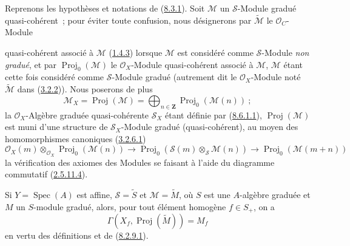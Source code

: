 \begin{env}[8.12.1]
\label{II.8.12.1-fr}
Reprenons les hypothèses et notations de
(\hyperref[II.8.3.1-fr]{8.3.1}). Soit $\mathcal{M}$ un
$\mathcal{S}$-Module gradué quasi-cohérent~; pour éviter toute confusion,
nous désignerons par $\widetilde{\mathcal{M}}$ le $\mathcal{O}_C$-Module

quasi-cohérent associé à $\mathcal{M}$
(\hyperref[II.1.4.3-fr]{1.4.3}) lorsque $\mathcal{M}$ est considéré comme
$\mathcal{S}$-Module \emph{non gradué}, et par
$\operatorname{Proj}_0(\mathcal{M})$ le $\mathcal{O}_X$-Module
quasi-cohérent associé à $\mathcal{M}$, $\mathcal{M}$ étant cette fois
considéré comme $\mathcal{S}$-Module gradué (autrement dit le
$\mathcal{O}_X$-Module noté $\widetilde{\mathcal{M}}$ dans
(\hyperref[II.3.2.2-fr]{3.2.2})). Nous poserons de plus
\begin{equation}
\label{II.8.12.1.1-fr}
  \mathcal{M}_X=\operatorname{Proj}(\mathcal{M})
  =\bigoplus_{n\in\mathbf{Z}}\operatorname{Proj}_0(\mathcal{M}(n))~;
\tag{8.12.1.1}
\end{equation}
la $\mathcal{O}_X$-Algèbre graduée quasi-cohérente $\mathcal{S}_X$ étant
définie par (\hyperref[II.8.6.1.1-fr]{8.6.1.1}),
$\operatorname{Proj}(\mathcal{M})$ est muni d'une structure de
$\mathcal{S}_X$-Module gradué (quasi-cohérent), au moyen des homomorphismes
canoniques (\hyperref[II.3.2.6.1-fr]{3.2.6.1})
\begin{equation}
\label{II.8.12.1.2-fr}
  \mathcal{O}_X(m)\otimes_{\mathcal{O}_X}
  \operatorname{Proj}_0(\mathcal{M}(n))
  \to \operatorname{Proj}_0(\mathcal{S}(m)\otimes_{\mathcal{S}}\mathcal{M}(n))
  \to \operatorname{Proj}_0(\mathcal{M}(m+n))
\tag{8.12.1.2}
\end{equation}
la vérification des axiomes des Modules se faisant à l'aide du diagramme
commutatif (\hyperref[II.2.5.11.4-fr]{2.5.11.4}).

Si $Y=\operatorname{Spec}(A)$ est affine, $\mathcal{S}=\widetilde{S}$ et
$\mathcal{M}=\widetilde{M}$, où $S$ est une $A$-algèbre graduée et $M$ un
$S$-module gradué, alors, pour tout élément homogène $f\in S_+$, on a
\begin{equation}
\label{II.8.12.1.3-fr}
  \Gamma(X_f,\operatorname{Proj}(\widetilde{M}))=M_f
\tag{8.12.1.3}
\end{equation}
en vertu des définitions et de (\hyperref[II.8.2.9.1-fr]{8.2.9.1}).


\end{env}
